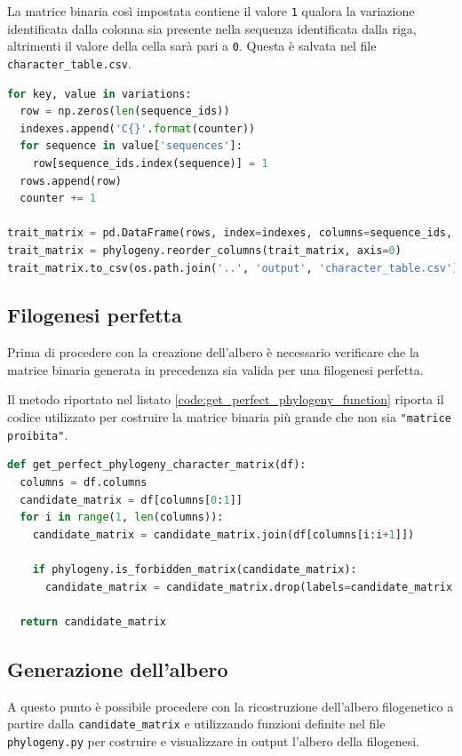\documentclass[11pt,italian]{article}
\begin{document}
La matrice binaria così impostata contiene il valore \lstinline{1} qualora la variazione identificata dalla colonna sia presente nella sequenza identificata dalla riga, altrimenti il valore della cella sarà pari a \lstinline{0}.
Questa è salvata nel file \lstinline{character_table.csv}.

\begin{lstlisting}[caption=Generazione della matrice binaria di caratteri,label=code:creation table.csv,language=Python]
for key, value in variations:
  row = np.zeros(len(sequence_ids))
  indexes.append('C{}'.format(counter))
  for sequence in value['sequences']:
    row[sequence_ids.index(sequence)] = 1
  rows.append(row)
  counter += 1

trait_matrix = pd.DataFrame(rows, index=indexes, columns=sequence_ids, dtype=np.uint8).transpose()
trait_matrix = phylogeny.reorder_columns(trait_matrix, axis=0)
trait_matrix.to_csv(os.path.join('..', 'output', 'character_table.csv'))
\end{lstlisting}

\subsection{Filogenesi perfetta}
Prima di procedere con la creazione dell'albero è necessario verificare che la matrice binaria generata in precedenza sia valida per una filogenesi perfetta.

Il metodo riportato nel listato \ref{code:get_perfect_phylogeny_function} riporta il codice utilizzato
per costruire la matrice binaria più grande che non sia \lstinline{"matrice proibita"}.

\begin{lstlisting}[caption=Funzione di generazione della matrice binaria per filogenesi perfetta,label=code:get_perfect_phylogeny_function,language=Python]
def get_perfect_phylogeny_character_matrix(df):
  columns = df.columns
  candidate_matrix = df[columns[0:1]]
  for i in range(1, len(columns)):
    candidate_matrix = candidate_matrix.join(df[columns[i:i+1]])

    if phylogeny.is_forbidden_matrix(candidate_matrix):
      candidate_matrix = candidate_matrix.drop(labels=candidate_matrix.columns[-1], axis=1)

  return candidate_matrix
\end{lstlisting}

\subsection{Generazione dell'albero}
A questo punto è possibile procedere con la ricostruzione dell'albero filogenetico a partire dalla \lstinline{candidate_matrix} e utilizzando funzioni definite nel file \lstinline{phylogeny.py} per costruire e visualizzare in output l'albero della filogenesi.
\end{document}

